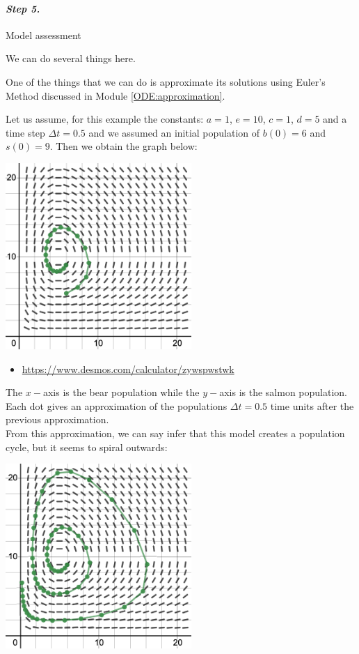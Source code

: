\paragraph{\emph{Step 5.}} Model assessment

\begin{example}

We can do several things here. 

One of the things that we can do is approximate its solutions using Euler's Method discussed in Module \ref{ODE:approximation}. 

Let us assume, for this example the constants: $a=1$, $e=10$, $c=1$, $d=5$ and a time step $\Delta t = 0.5$ and we assumed an initial population of $b(0)=6$ and $s(0)=9$. Then we obtain the graph below:


\begin{center}
\includegraphics*[width=200pt]{images/module16-lotka-volterra.png}
\end{center}
\begin{itemize}
	\item \url{https://www.desmos.com/calculator/zywspwstwk} \hfill {}
\end{itemize}

The $x-$axis is the bear population while the $y-$axis is the salmon population. Each dot gives an approximation of the populations $\Delta t = 0.5$ time units after the previous approximation.\\


From this approximation, we can say infer that this model creates a population cycle, but it seems to spiral outwards: 
\begin{center}
\includegraphics*[width=200pt]{images/module16-lotka-volterra-more.png}
\end{center}


\end{example}
